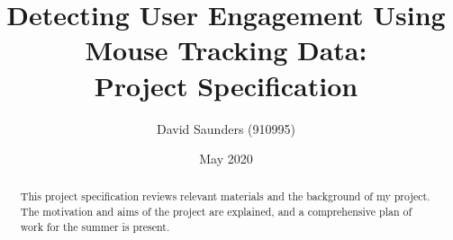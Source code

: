 \documentclass{article}
\title{Detecting User Engagement Using \\ Mouse Tracking Data:\\
    \large Project Specification
}
\author{David Saunders (910995)}
\date{May 2020}
\begin{document}
\maketitle

\begin{abstract} 
    This project specification reviews relevant materials and the background of my project.
    The motivation and aims of the project are explained, and a comprehensive plan of work for the summer is present.
    
\end{abstract}

\tableofcontents

\newpage






% 



\end{document}
